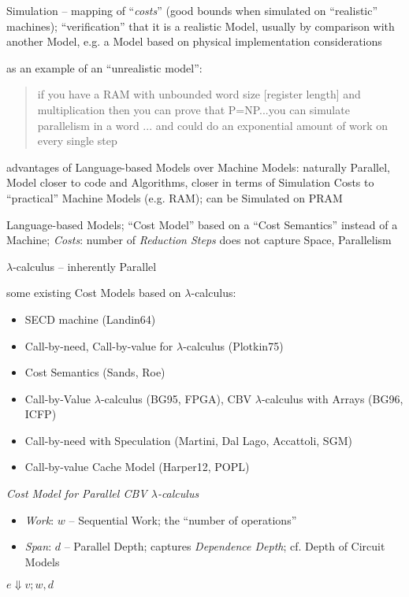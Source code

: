 Simulation -- mapping of ``\emph{costs}'' (good bounds when simulated on
``realistic'' machines); ``verification'' that it is a realistic Model,
usually by comparison with another Model, e.g. a Model based on physical
implementation considerations

as an example of an ``unrealistic model'':
\begin{quote}
if you have a RAM with unbounded word size [register length] and multiplication
then you can prove that P=NP...you can simulate parallelism in a word ... and
could do an exponential amount of work on every single step
\end{quote}

advantages of Language-based Models over Machine Models: naturally Parallel,
Model closer to code and Algorithms, closer in terms of Simulation Costs to
``practical'' Machine Models (e.g. RAM); can be Simulated on PRAM

Language-based Models; ``Cost Model'' based on a ``Cost Semantics'' instead of a
Machine; \emph{Costs}: number of \emph{Reduction Steps} does not capture Space,
Parallelism

$\lambda$-calculus -- inherently Parallel

some existing Cost Models based on $\lambda$-calculus:
\begin{itemize}
  \item SECD machine (Landin64)
  \item Call-by-need, Call-by-value for $\lambda$-calculus (Plotkin75)
  \item Cost Semantics (Sands, Roe)
  \item Call-by-Value $\lambda$-calculus (BG95, FPGA), CBV $\lambda$-calculus
    with Arrays (BG96, ICFP)
  \item Call-by-need with Speculation (Martini, Dal Lago, Accattoli, SGM)
  \item Call-by-value Cache Model (Harper12, POPL)
\end{itemize}

\emph{Cost Model for Parallel CBV $\lambda$-calculus}

\begin{itemize}
  \item \emph{Work}: $w$ -- Sequential Work; the ``number of operations''
  \item \emph{Span}: $d$ -- Parallel Depth; captures \emph{Dependence Depth};
    cf. Depth of Circuit Models
\end{itemize}

$e \Downarrow v; w,d$

